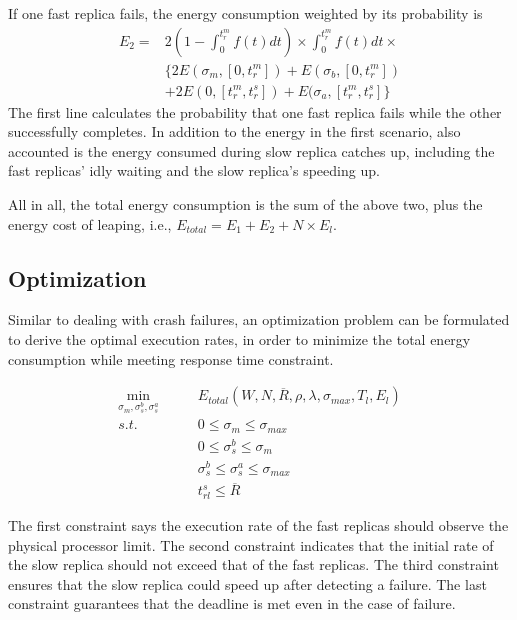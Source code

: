 If one fast replica fails, the energy consumption weighted by its probability is 
\begin{equation}
\begin{split}
E_2 = & 2(1 - \int_{0}^{t_r^m} f(t)dt) \times \int_{0}^{t_r^m} f(t)dt \times 
\\  & \{2E(\sigma_m, [0, t_r^m])+E(\sigma_b, [0, t_r^m]) \\ & + 2E(0, [t_r^m, t_r^s])+E(\sigma_a, [t_r^m, t_r^s]\} 
\end{split}
\end{equation}
The first line calculates the probability that one fast replica fails while the other successfully completes. In addition to the energy in the first scenario, also accounted is the energy consumed during slow replica catches up, including the fast replicas' idly waiting and the slow replica's speeding up. 



All in all, the total energy consumption is the sum of the above two, plus the energy cost of leaping, i.e., $E_{total}=E_1 + E_2 + N\times E_l$. 

\subsection{Optimization}
\label{sec:silent_opt}
Similar to dealing with crash failures, an optimization problem can be formulated to derive the optimal execution rates, in order to minimize the total energy consumption while meeting response time constraint. 

\begin{equation}
\begin{alignedat}{2}
\min_{\sigma_m,\sigma_s^b,\sigma_s^a} \qquad  & E_{total} (W,N,\overline{R},\rho,\lambda,\sigma_{max}, T_l, E_l)  \\
s.t.  \qquad          & 0 \leq \sigma_m \leq \sigma_{max} \\
                      & 0 \leq \sigma_s^b \leq \sigma_m\\
                      & \sigma_s^b \leq \sigma_s^a \leq \sigma_{max} \\
                      & t_{rl}^s \leq \overline{R}
\end{alignedat}
\end{equation}

The first constraint says the execution rate of the fast replicas should observe the physical processor limit. The second constraint indicates that the initial rate of the slow replica should not exceed that of the fast replicas. The third constraint ensures that the slow replica could speed up after detecting a failure. The last constraint guarantees that the deadline is met even in the case of failure.







